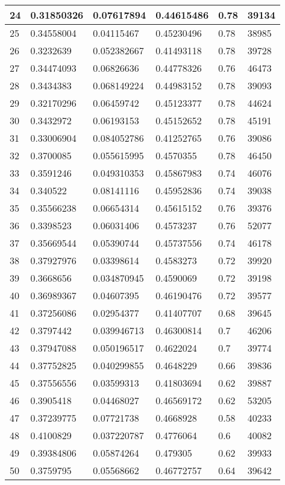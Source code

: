\begin{longtable}{|l|l|l|l|l|l|}
24 & 0.31850326 & 0.07617894 & 0.44615486 & 0.78 & 39134 \\ \hline 
25 & 0.34558004 & 0.04115467 & 0.45230496 & 0.78 & 38985 \\ \hline 
26 & 0.3232639 & 0.052382667 & 0.41493118 & 0.78 & 39728 \\ \hline 
27 & 0.34474093 & 0.06826636 & 0.44778326 & 0.76 & 46473 \\ \hline 
28 & 0.3434383 & 0.068149224 & 0.44983152 & 0.78 & 39093 \\ \hline 
29 & 0.32170296 & 0.06459742 & 0.45123377 & 0.78 & 44624 \\ \hline 
30 & 0.3432972 & 0.06193153 & 0.45152652 & 0.78 & 45191 \\ \hline 
31 & 0.33006904 & 0.084052786 & 0.41252765 & 0.76 & 39086 \\ \hline 
32 & 0.3700085 & 0.055615995 & 0.4570355 & 0.78 & 46450 \\ \hline 
33 & 0.3591246 & 0.049310353 & 0.45867983 & 0.74 & 46076 \\ \hline 
34 & 0.340522 & 0.08141116 & 0.45952836 & 0.74 & 39038 \\ \hline 
35 & 0.35566238 & 0.06654314 & 0.45615152 & 0.76 & 39376 \\ \hline 
36 & 0.3398523 & 0.06031406 & 0.4573237 & 0.76 & 52077 \\ \hline 
37 & 0.35669544 & 0.05390744 & 0.45737556 & 0.74 & 46178 \\ \hline 
38 & 0.37927976 & 0.03398614 & 0.4583273 & 0.72 & 39920 \\ \hline 
39 & 0.3668656 & 0.034870945 & 0.4590069 & 0.72 & 39198 \\ \hline 
40 & 0.36989367 & 0.04607395 & 0.46190476 & 0.72 & 39577 \\ \hline 
41 & 0.37256086 & 0.02954377 & 0.41407707 & 0.68 & 39645 \\ \hline 
42 & 0.3797442 & 0.039946713 & 0.46300814 & 0.7 & 46206 \\ \hline 
43 & 0.37947088 & 0.050196517 & 0.4622024 & 0.7 & 39774 \\ \hline 
44 & 0.37752825 & 0.040299855 & 0.4648229 & 0.66 & 39836 \\ \hline 
45 & 0.37556556 & 0.03599313 & 0.41803694 & 0.62 & 39887 \\ \hline 
46 & 0.3905418 & 0.04468027 & 0.46569172 & 0.62 & 53205 \\ \hline 
47 & 0.37239775 & 0.07721738 & 0.4668928 & 0.58 & 40233 \\ \hline 
48 & 0.4100829 & 0.037220787 & 0.4776064 & 0.6 & 40082 \\ \hline 
49 & 0.39384806 & 0.05874264 & 0.479305 & 0.62 & 39933 \\ \hline 
50 & 0.3759795 & 0.05568662 & 0.46772757 & 0.64 & 39642 \\ \hline 
\end{longtable}